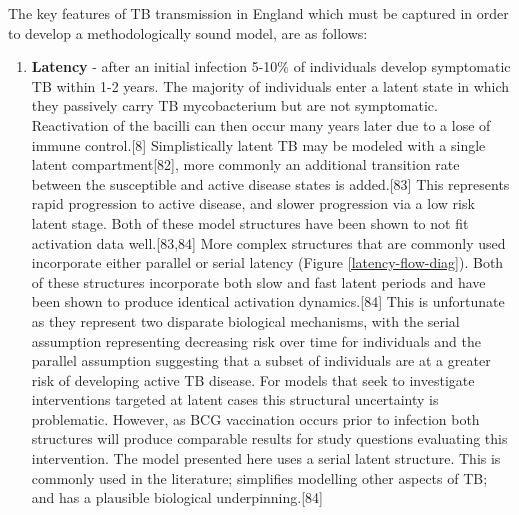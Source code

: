 \documentclass[11pt,twoside]{bristolthesis}
\providecommand{\tightlist}{%
  \setlength{\itemsep}{0pt}\setlength{\parskip}{0pt}}
\begin{document}
  The key features of TB transmission in England which must be captured in order to develop a methodologically sound model, are as follows:
  \begin{enumerate}
  \def\labelenumi{\arabic{enumi}.}
  \tightlist
  \item
    \textbf{Latency} - after an initial infection 5-10\% of individuals develop symptomatic TB within 1-2 years. The majority of individuals enter a latent state in which they passively carry TB mycobacterium but are not symptomatic. Reactivation of the bacilli can then occur many years later due to a lose of immune control.{[}8{]} Simplistically latent TB may be modeled with a single latent compartment{[}82{]}, more commonly an additional transition rate between the susceptible and active disease states is added.{[}83{]} This represents rapid progression to active disease, and slower progression via a low risk latent stage. Both of these model structures have been shown to not fit activation data well.{[}83,84{]} More complex structures that are commonly used incorporate either parallel or serial latency (Figure \ref{latency-flow-diag}). Both of these structures incorporate both slow and fast latent periods and have been shown to produce identical activation dynamics.{[}84{]} This is unfortunate as they represent two disparate biological mechanisms, with the serial assumption representing decreasing risk over time for individuals and the parallel assumption suggesting that a subset of individuals are at a greater risk of developing active TB disease. For models that seek to investigate interventions targeted at latent cases this structural uncertainty is problematic. However, as BCG vaccination occurs prior to infection both structures will produce comparable results for study questions evaluating this intervention. The model presented here uses a serial latent structure. This is commonly used in the literature; simplifies modelling other aspects of TB; and has a plausible biological underpinning.{[}84{]}
  \end{enumerate}
\end{document}

